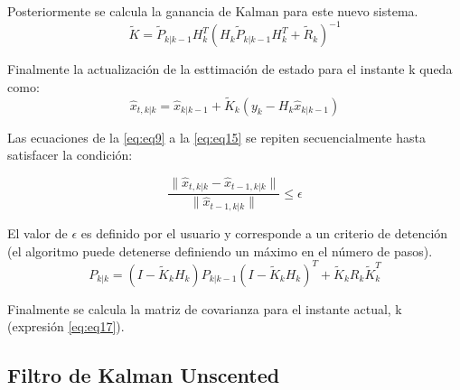 Posteriormente se calcula la ganancia de Kalman para este nuevo sistema.
\begin{equation}
\tilde{K} = \tilde{P}_{k|k-1} H_k^T (H_k \tilde{P}_{k|k-1} H_k^T + \tilde{R}_k)^{-1} 
\label{eq:eq14}
\end{equation}

Finalmente la actualizaci\'on de la esttimaci\'on de estado para el instante k queda como: 
\begin{equation}
\hat{x}_{t, k|k} = \hat{x}_{k|k-1} + \tilde{K}_{k} (y_k - H_k \hat{x}_{k|k-1})
\label{eq:eq15}
\end{equation}
\bigskip

Las ecuaciones de la \ref{eq:eq9} a la \ref{eq:eq15} se repiten secuencialmente hasta satisfacer la condici\'on:

\begin{equation}
\dfrac{\parallel  \hat{x}_{t, k|k} - \hat{x}_{t-1, k|k} \parallel }{\parallel \hat{x}_{t-1, k|k} \parallel} \leq \epsilon
\label{eq:eq16}
\end{equation}

El valor de $\epsilon$ es definido por el usuario y corresponde a un criterio de detenci\'on (el algoritmo puede detenerse definiendo un m\'aximo en el n\'umero de pasos).
\begin{equation}
P_{k|k} = \left(I - \tilde{K}_kH_k \right)P_{k|k-1} \left(I - \tilde{K}_k H_k \right)^T + \tilde{K}_kR_k\tilde{K}^T_k
\label{eq:eq17}
\end{equation}

Finalmente se calcula la matriz de covarianza para el instante actual, k (expresi\'on \ref{eq:eq17}).

\subsection{Filtro de Kalman Unscented}

